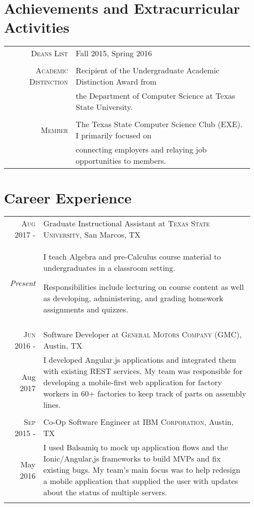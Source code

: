 \documentclass[a4paper,10pt]{article}
\begin{document}
\section{Achievements and Extracurricular Activities}
\begin{tabular}{rl}
 \textsc{Deans List} & Fall 2015, Spring 2016 \\

& \\
\textsc{Academic Distinction} & Recipient of the Undergraduate Academic Distinction Award from \\ & the Department of Computer Science at Texas State University. \\

& \\
\textsc{Member} & The Texas State Computer Science Club (EXE). I primarily focused on \\
	& connecting employers and relaying job opportunities to members. \\
\end{tabular}

\section{Career Experience}
\begin{tabular}{r|p{12cm}}
\textsc{Aug 2017 -} & Graduate Instructional Assistant at \textsc{Texas State University}, San Marcos, TX \\
\emph{Present} & \footnotesize{I teach Algebra and pre-Calculus course material to undergraduates in a classroom setting.
 
 	Responsibilities include lecturing on course content as well as developing, administering, and grading homework assignments and quizzes.} \\
 \multicolumn{2}{c}{} \\
 
 \textsc{Jun 2016 -} & Software Developer at \textsc{General Motors Company (GMC)}, Austin, TX \\
Aug 2017 & \footnotesize{I developed Angular.js applications and integrated them with existing REST services. My team was responsible for developing a mobile-first web application for factory workers in 60+ factories to keep track of parts on assembly lines.
} \\
 \multicolumn{2}{c}{} \\
 
 \textsc{Sep 2015 -} & Co-Op Software Engineer at \textsc{IBM Corporation}, Austin, TX \\
 May 2016 & \footnotesize{I used Balsamiq to mock up application flows and the Ionic/Angular.js frameworks to build MVPs and fix existing bugs. My team's main focus was to help redesign a mobile application that supplied the user with updates about the status of multiple servers.} \\
 \multicolumn{2}{c}{} \\
\end{tabular}
\end{document}
